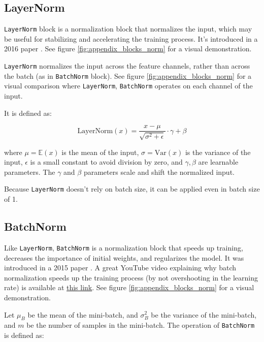 \subsection*{LayerNorm}

\texttt{LayerNorm} block is a normalization block that normalizes the input, which may be useful for stabilizing and accelerating the training process. It's introduced in a 2016 paper \cite{layernorm}. See figure \ref{fig:appendix_blocks_norm} for a visual demonstration.

\texttt{LayerNorm} normalizes the input across the feature channels, rather than across the batch (as in \texttt{BatchNorm} block). See figure \ref{fig:appendix_blocks_norm} for a visual comparison where \texttt{LayerNorm}, \texttt{BatchNorm} operates on each channel of the input.

It is defined as:

\begin{equation*}
    \text{LayerNorm}(x) = \frac{x - \mu}{\sqrt{\sigma^2 + \epsilon}} \cdot \gamma + \beta
\end{equation*}

where $\mu = \mathbb{E}(x)$ is the mean of the input, $\sigma = \text{Var} (x)$ is the variance of the input, $\epsilon$ is a small constant to avoid division by zero, and $\gamma, \beta$ are learnable parameters. The $\gamma$ and $\beta$ parameters scale and shift the normalized input.

Because \texttt{LayerNorm} doesn't rely on batch size, it can be applied even in batch size of 1.








\subsection*{BatchNorm}

Like \texttt{LayerNorm}, \texttt{BatchNorm} is a normalization block that speeds up training, decreases the importance of initial weights, and regularizes the model. It was introduced in a 2015 paper \cite{batchnorm}. A great YouTube video explaining why batch normalization speeds up the training process (by not overshooting in the learning rate) is available at \href{https://www.youtube.com/watch?v=DtEq44FTPM4}{this link}. See figure \ref{fig:appendix_blocks_norm} for a visual demonstration.

Let $\mu_B$ be the mean of the mini-batch, and $\sigma^2_B$ be the variance of the mini-batch, and $m$ be the number of samples in the mini-batch. The operation of \texttt{BatchNorm} is defined as:

